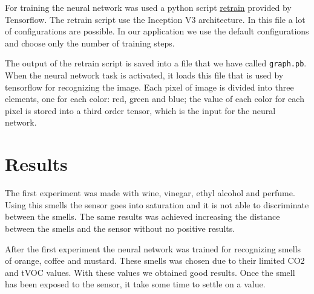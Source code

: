 \documentclass[12pt]{article}
\begin{document}
For training the neural network was used a python script
\href{https://www.tensorflow.org/hub/tutorials/image\_retraining}{retrain}
provided by Tensorflow. The retrain script use the Inception V3 architecture.
In this file a lot of configurations are possible. In our application we use
the default configurations and choose only the number of training steps.

The output of the retrain script is saved into a file that we have called
\texttt{graph.pb}. When the neural network task is activated, it loads this
file that is used by tensorflow for recognizing the image. Each pixel of
image is divided into three elements, one for each color: red, green and
blue; the value of each color for each pixel is stored into a third order
tensor, which is the input for the neural network.

\section{Results}

The first experiment was made with wine, vinegar, ethyl alcohol and perfume.
Using this smells the sensor goes into saturation and it is not able to
discriminate between the smells. The same results was achieved increasing the
distance between the smells and the sensor without no positive results.

After the first experiment the neural network was trained for recognizing
smells of orange, coffee and mustard. These smells was chosen due to their
limited CO2 and tVOC values. With these values we obtained good results. Once
the smell has been exposed to the sensor, it take some time to settle on a
value.
\end{document}
